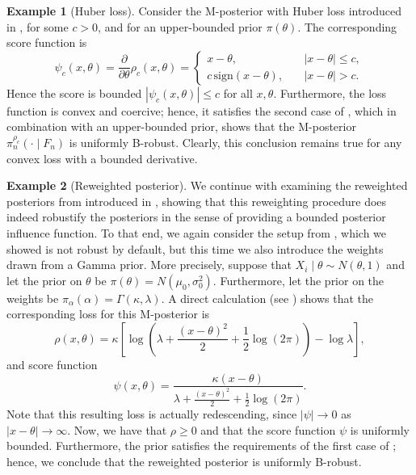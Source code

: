\documentclass[11pt, oneside]{amsart}
\theoremstyle{definition}   %
\newtheorem{example}{Example}
\newcommand{\loss}{\rho}
\newcommand{\score}{\psi}
\begin{document}
\begin{example}[Huber loss]
Consider the M-posterior with Huber loss introduced in ,
for some \(c>0\), and for an upper-bounded prior \( \pi(\theta) \). 
%
The corresponding score function is
\[
  \score_c(x,\theta) = \frac{\partial}{\partial\theta}\loss_c(x,\theta)
  =
  \begin{cases}
    x-\theta,  & \quad |x-\theta|\le c,\\
    c\,\mathrm{sign}(x-\theta), & \quad |x-\theta |>c.
  \end{cases}
\]
Hence the score is bounded \(|\score_c(x,\theta)|\leq c\) for all \(x,\theta\). Furthermore, the loss function is convex and coercive; hence, it satisfies the second case of , which in combination with an upper-bounded prior, shows that the M-posterior \(\pi_n^{\loss_c} (\cdot \mid F_n)\) is uniformly B-robust. Clearly, this conclusion remains true for any convex loss with a bounded derivative.
%
\end{example}
%

%
%
\begin{example}[Reweighted posterior] 
\label{example::bias-robust-reweighted-posterior}
We continue with examining the reweighted posteriors from \cite{wang:kucukelbir:blei2017} introduced in , showing that this reweighting procedure does indeed robustify the posteriors in the sense of providing a bounded posterior influence function.  To that end, we again consider the setup from , which we showed is not robust by default, but this time we also introduce the weights drawn from a Gamma prior. 
%
More precisely, suppose that \( X_i \mid \theta \sim N(\theta, 1) \) and let the prior on \( \theta \) be \( \pi(\theta) = N(\mu_0,\sigma_0^2) \). Furthermore, let the prior on the weights be \( \pi_\alpha(\alpha) = \Gamma(\kappa, \lambda) \).
%
A direct calculation (see ) shows that the corresponding loss for this M-posterior is
\[
    \loss(x, \theta) = \kappa \left [ \log \left ( \lambda + \frac{(x-\theta)^2}{2} + \frac{1}{2} \log(2\pi) \right ) - \log \lambda \right ],
\]
%
and score function
%
\[
    \psi(x, \theta) = \frac{\kappa(x-\theta)}{\lambda + \frac{(x-\theta )^2}{2} + \frac{1}{2} \log(2\pi)}.
\]
%
Note that this resulting loss is actually redescending, since \( | \psi | \rightarrow 0 \) as \(|x - \theta | \rightarrow \infty \). Now, we have that \( \loss \geq 0\) and that the score function \( \psi \) is uniformly bounded. Furthermore, the prior satisfies the requirements of the first case of ; hence, we conclude that the reweighted posterior is uniformly B-robust. 
%
\end{example}
\end{document}
